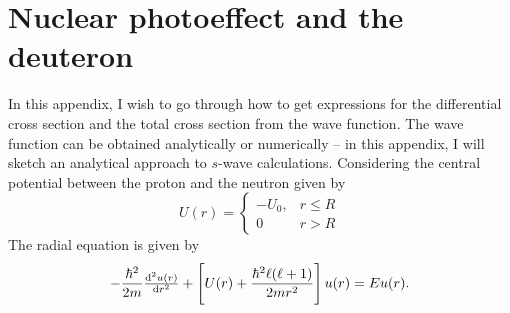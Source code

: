 
\newcommand{\projecttitle}{threshold pion photo-production off nucleons using the nuclear model with explicit pions}


\appendix

\chapter{Nuclear photoeffect and the deuteron}
In this appendix, I wish to go through how to get expressions for the differential cross section and the total cross section from the wave function. The wave function can be obtained analytically or numerically -- in this appendix, I will sketch an analytical approach to $s$-wave calculations. 
Considering the central potential between the proton and the neutron given by
  \[ U(r)= \begin{cases}
        -U_0, & r \leq R \\
        0 & r > R
     \end{cases}
  \]
  The radial equation is given by
  \begin{equation}
  	-\frac{\hbar^2}{2m} \od[2]{u(r)}{r}+\left[U(r)+\frac{\hbar^2 \ell(\ell+1)}{2mr^2} \right]u(r)=Eu(r).
  \end{equation}
